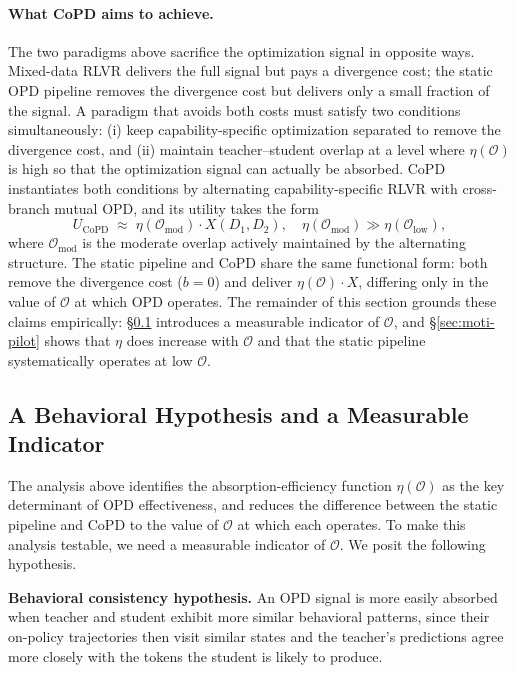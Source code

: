 \documentclass{llmxive}
\begin{document}
\paragraph{What CoPD aims to achieve.}
The two paradigms above sacrifice the optimization signal in opposite ways. Mixed-data RLVR delivers the full signal but pays a divergence cost; the static OPD pipeline removes the divergence cost but delivers only a small fraction of the signal. A paradigm that avoids both costs must satisfy two conditions simultaneously: (i) keep capability-specific optimization separated to remove the divergence cost, and (ii) maintain teacher--student overlap at a level where $\eta(\mathcal{O})$ is high so that the optimization signal can actually be absorbed. CoPD instantiates both conditions by alternating capability-specific RLVR with cross-branch mutual OPD, and its utility takes the form
\begin{equation}
U_{\text{CoPD}} \;\approx\; \eta(\mathcal{O}_{\text{mod}}) \cdot X(D_1, D_2), \quad \eta(\mathcal{O}_{\text{mod}}) \gg \eta(\mathcal{O}_{\text{low}}),
\label{eq:utility-copd}
\end{equation}
where $\mathcal{O}_{\text{mod}}$ is the moderate overlap actively maintained by the alternating structure. The static pipeline and CoPD share the same functional form: both remove the divergence cost ($b = 0$) and deliver $\eta(\mathcal{O}) \cdot X$, differing only in the value of $\mathcal{O}$ at which OPD operates. The remainder of this section grounds these claims empirically: \S\ref{sec:moti-hypothesis} introduces a measurable indicator of $\mathcal{O}$, and \S\ref{sec:moti-pilot} shows that $\eta$ does increase with $\mathcal{O}$ and that the static pipeline systematically operates at low $\mathcal{O}$.

\subsection{A Behavioral Hypothesis and a Measurable Indicator}
\label{sec:moti-hypothesis}

The analysis above identifies the absorption-efficiency function $\eta(\mathcal{O})$ as the key determinant of OPD effectiveness, and reduces the difference between the static pipeline and CoPD to the value of $\mathcal{O}$ at which each operates. To make this analysis testable, we need a measurable indicator of $\mathcal{O}$. We posit the following hypothesis.

\begin{tcolorbox}[colback=gray!8, colframe=gray!50, boxrule=0.5pt, arc=2pt]
\textbf{Behavioral consistency hypothesis.} An OPD signal is more easily absorbed when teacher and student exhibit more similar behavioral patterns, since their on-policy trajectories then visit similar states and the teacher's predictions agree more closely with the tokens the student is likely to produce.
\end{tcolorbox}
\end{document}
